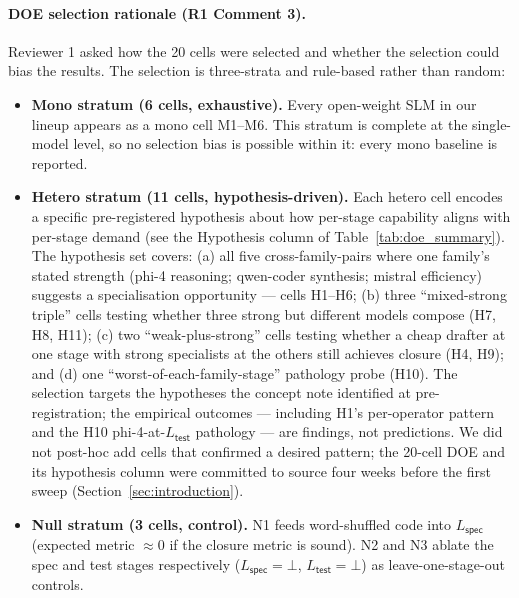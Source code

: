 \paragraph{DOE selection rationale (R1 Comment 3).}
Reviewer 1 asked how the 20 cells were selected and whether the selection could bias the results. The selection is three-strata and rule-based rather than random:

\begin{itemize}
  \item \textbf{Mono stratum (6 cells, exhaustive).} Every open-weight SLM in our lineup appears as a mono cell M1--M6. This stratum is complete at the single-model level, so no selection bias is possible within it: every mono baseline is reported.
  \item \textbf{Hetero stratum (11 cells, hypothesis-driven).} Each hetero cell encodes a specific pre-registered hypothesis about how per-stage capability aligns with per-stage demand (see the Hypothesis column of Table~\ref{tab:doe_summary}). The hypothesis set covers: (a) all five cross-family-pairs where one family's stated strength (phi-4 reasoning; qwen-coder synthesis; mistral efficiency) suggests a specialisation opportunity --- cells H1--H6; (b) three ``mixed-strong triple'' cells testing whether three strong but different models compose (H7, H8, H11); (c) two ``weak-plus-strong'' cells testing whether a cheap drafter at one stage with strong specialists at the others still achieves closure (H4, H9); and (d) one ``worst-of-each-family-stage'' pathology probe (H10). The selection targets the hypotheses the concept note identified at pre-registration; the empirical outcomes --- including H1's per-operator pattern and the H10 phi-4-at-$L_{\textsf{test}}$ pathology --- are findings, not predictions. We did not post-hoc add cells that confirmed a desired pattern; the 20-cell DOE and its hypothesis column were committed to source four weeks before the first sweep (Section~\ref{sec:introduction}).
  \item \textbf{Null stratum (3 cells, control).} N1 feeds word-shuffled code into $L_{\textsf{spec}}$ (expected metric $\approx 0$ if the closure metric is sound). N2 and N3 ablate the spec and test stages respectively ($L_{\textsf{spec}} = \bot$, $L_{\textsf{test}} = \bot$) as leave-one-stage-out controls.
\end{itemize}

